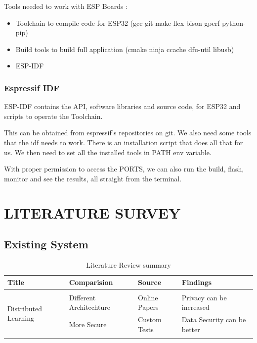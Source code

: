 \documentclass[14pt]{extarticle}
\begin{document}
Tools needed to work with ESP Boards :
\begin{itemize}
    \item Toolchain to compile code for ESP32 (gcc git make flex bison gperf python-pip)
    \item Build tools to build full application (cmake ninja ccache dfu-util libusb)
    \item ESP-IDF
\end{itemize}

\subsubsection{Espressif IDF}

\par ESP-IDF contains the API, software libraries and source code, for ESP32 and scripts to operate the Toolchain. 

\par This can be obtained from espressif's repositories on git. We also need some tools that the idf needs to work. There is an installation script that does all that for us. We then need to set all the installed tools in PATH env variable.

\par With proper permission to access the PORTS, we can also run the build, flash, monitor and see the results, all straight from the terminal.



\newpage
\section{LITERATURE SURVEY}
\subsection{Existing System}
\begin{table}[h!]
    \centering
    \begin{tabular}[]{|m{7em}|m{10em}|m{7em}|m{7em}|}
        \hline
        Title & Comparision & Source & Findings\\
        \hline
        &&&\\
        \multirow{2}{7em}{Distributed Learning} & Different Architechture & Online Papers & Privacy can be increased\\
        & More Secure & Custom Tests& Data Security can be better\\
        &&& \\
        \hline
    \end{tabular}
    \caption{Literature Review summary}
    \label{Table : 1}
\end{table}
\newpage
\end{document}
